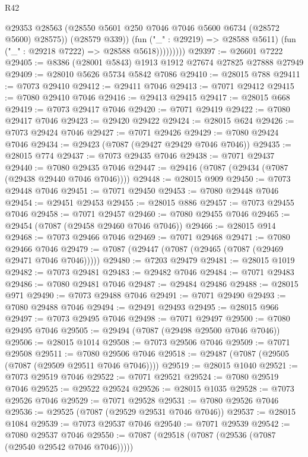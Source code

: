 \begin{lexlean}{R42}
\begin{coremodule}
{                        @29353
                        @28563
                        (@28550 @5601 @250 @7046 @7046 @5600 @6734 (@28572 @5600) @28575))
                      (@28579 @339))
                    (fun ("_" : @29219) => @28588 @5611)
                    (fun ("_" : @29218 @7222) => @28588 @5618)))))))))
@29397 := @26601 @7222
@29405 := @8386 (@28001 @5843) @1913 @1912 @27674 @27825 @27888 @27949
@29409 := @28010 @5626 @5734 @5842 @7086
@29410 := @28015 @788
@29411 := @7073 @29410
@29412 := @29411 @7046
@29413 := @7071 @29412
@29415 := @7080 @29410 @7046
@29416 := @29413 @29415
@29417 := @28015 @668
@29419 := @7073 @29417 @7046
@29420 := @7071 @29419
@29422 := @7080 @29417 @7046
@29423 := @29420 @29422
@29424 := @28015 @624
@29426 := @7073 @29424 @7046
@29427 := @7071 @29426
@29429 := @7080 @29424 @7046
@29434 := @29423 (@7087 (@29427 @29429 @7046 @7046))
@29435 := @28015 @774
@29437 := @7073 @29435 @7046
@29438 := @7071 @29437
@29440 := @7080 @29435 @7046
@29447 := @29416 (@7087 (@29434 (@7087 (@29438 @29440 @7046 @7046))))
@29448 := @28015 @909
@29450 := @7073 @29448 @7046
@29451 := @7071 @29450
@29453 := @7080 @29448 @7046
@29454 := @29451 @29453
@29455 := @28015 @886
@29457 := @7073 @29455 @7046
@29458 := @7071 @29457
@29460 := @7080 @29455 @7046
@29465 := @29454 (@7087 (@29458 @29460 @7046 @7046))
@29466 := @28015 @914
@29468 := @7073 @29466 @7046
@29469 := @7071 @29468
@29471 := @7080 @29466 @7046
@29479 := @7087 (@29447 (@7087 (@29465 (@7087 (@29469 @29471 @7046 @7046)))))
@29480 := @7203 @29479
@29481 := @28015 @1019
@29482 := @7073 @29481
@29483 := @29482 @7046
@29484 := @7071 @29483
@29486 := @7080 @29481 @7046
@29487 := @29484 @29486
@29488 := @28015 @971
@29490 := @7073 @29488 @7046
@29491 := @7071 @29490
@29493 := @7080 @29488 @7046
@29494 := @29491 @29493
@29495 := @28015 @966
@29497 := @7073 @29495 @7046
@29498 := @7071 @29497
@29500 := @7080 @29495 @7046
@29505 := @29494 (@7087 (@29498 @29500 @7046 @7046))
@29506 := @28015 @1014
@29508 := @7073 @29506 @7046
@29509 := @7071 @29508
@29511 := @7080 @29506 @7046
@29518 := @29487 (@7087 (@29505 (@7087 (@29509 @29511 @7046 @7046))))
@29519 := @28015 @1040
@29521 := @7073 @29519 @7046
@29522 := @7071 @29521
@29524 := @7080 @29519 @7046
@29525 := @29522 @29524
@29526 := @28015 @1035
@29528 := @7073 @29526 @7046
@29529 := @7071 @29528
@29531 := @7080 @29526 @7046
@29536 := @29525 (@7087 (@29529 @29531 @7046 @7046))
@29537 := @28015 @1084
@29539 := @7073 @29537 @7046
@29540 := @7071 @29539
@29542 := @7080 @29537 @7046
@29550 := @7087 (@29518 (@7087 (@29536 (@7087 (@29540 @29542 @7046 @7046)))))
}
\end{coremodule}
\end{lexlean}
